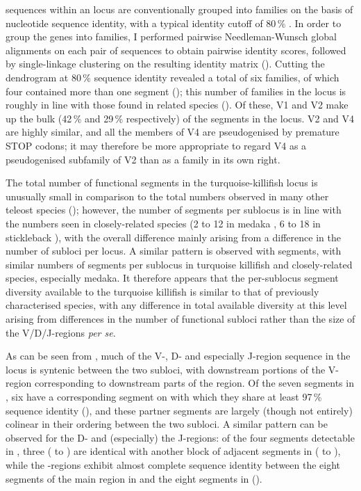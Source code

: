\vh sequences within an \igh{} locus are conventionally grouped into families on the basis of nucleotide sequence identity, with a typical identity cutoff of 80\,\% \parencite{magadan2015fishrepertoires}. In order to group the \Nfu \vh genes into families, I performed pairwise Needleman-Wunsch global alignments on each pair of \vh sequences to obtain pairwise identity scores, followed by single-linkage clustering on the resulting identity matrix (). Cutting the dendrogram at 80\,\% sequence identity revealed a total of six \vh families, of which four contained more than one \vh segment (); this number of \vh families in the \Nfu locus is roughly in line with those found in related species (). Of these, V1 and V2 make up the bulk (42\,\% and 29\,\% respectively) of the \vh segments in the locus. V2 and V4 are highly similar, and all the members of V4 are pseudogenised by premature STOP codons; it may therefore be more appropriate to regard V4 as a pseudogenised subfamily of V2 than as a \vh family in its own right.

The total number of functional \vh segments in the turquoise-killifish locus is unusually small in comparison to the total numbers observed in many other teleost species (); however, the number of segments per sublocus is in line with the numbers seen in closely-related species (2 to 12 in medaka \parencite{magadan2011medaka}, 6 to 18 in stickleback \parencite{gambondeza2011stickleback,bao2010stickleback}), with the overall difference mainly arising from a difference in the number of subloci per locus. A similar pattern is observed with \jh segments, with similar numbers of segments per sublocus in turquoise killifish and closely-related species, especially medaka. It therefore appears that the per-sublocus segment diversity available to the turquoise killifish is similar to that of previously characterised species, with any difference in total available diversity at this level arising from differences in the number of functional subloci rather than the size of the V/D/J-regions \textit{per se}.

As can be seen from , much of the V-, D- and especially J-region sequence in the \Nfu locus is syntenic between the two \igh{} subloci, with downstream portions of the  V-region corresponding to downstream parts of the  region. Of the seven \vh segments in , six have a corresponding segment on  with which they share at least 97\,\% sequence identity (), and these partner segments are largely (though not entirely) colinear in their ordering between the two subloci. A similar pattern can be observed for the D- and (especially) the J-regions: of the four \dh segments detectable in , three ( to ) are identical with another block of adjacent \dh segments in  ( to ), while the \jh-regions exhibit almost complete sequence identity between the eight \jh segments of the main \jh region in  and the eight \jh segments in  ().
		

